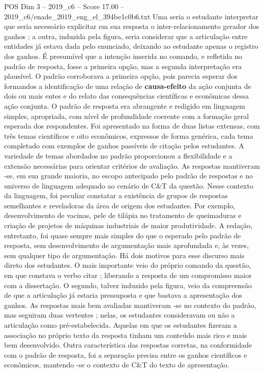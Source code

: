 \begin{textsample}{POS Dim 3 – 2019\_c6 – Score 17.00 – 2019\_c6/enade\_2019\_eng\_el\_394be1c0b6.txt}
Uma seria o estudante interpretar que seria necessário explicitar em sua resposta o inter-relacionamento gerador dos ganhos ; a outra, induzida pela figura, seria considerar que a articulação entre entidades já estava dada pelo enunciado, deixando ao estudante apenas o registro dos ganhos.
É presumível que a intenção inserida no comando, e refletida no padrão de resposta, fosse a primeira opção, mas a segunda interpretação era plausível.
O padrão corroborava a primeira opção, pois parecia esperar dos formandos a identificação de uma relação de \textbf{causa-efeito} da ação conjunta de dois ou mais entes e do relato das consequências científicas e econômicas dessa ação conjunta.
O padrão de resposta era abrangente e redigido em linguagem simples, apropriada, com nível de profundidade coerente com a formação geral esperada dos respondentes.
Foi apresentado na forma de duas listas extensas, com três temas científicos e oito econômicos, expressos de forma genérica, cada tema completado com exemplos de ganhos passíveis de citação pelos estudantes.
A variedade de temas abordados no padrão proporcionou a flexibilidade e a extensão necessárias para orientar critérios de avaliação.
As respostas mantiveram -se, em sua grande maioria, no escopo antecipado pelo padrão de respostas e no universo de linguagem adequado ao cenário de C\&T da questão.
Nesse contexto da linguagem, foi peculiar constatar a existência de grupos de respostas semelhantes e reveladoras da área de origem dos estudantes.
Por exemplo, desenvolvimento de vacinas, pele de tilápia no tratamento de queimaduras e criação de projetos de máquinas industriais de maior produtividade.
A redação, entretanto, foi quase sempre mais simples do que o esperado pelo padrão de resposta, sem desenvolvimento de argumentação mais aprofundada e, às vezes, sem qualquer tipo de argumentação.
Há dois motivos para esse discurso mais direto dos estudantes.
O mais importante veio do próprio comando da questão, em que constava o verbo citar ; liberando a resposta de um compromisso maior com a dissertação.
O segundo, talvez induzido pela figura, veio da compreensão de que a articulação já estaria pressuposta e que bastava a apresentação dos ganhos.
As respostas mais bem avaliadas mantiveram -se no contexto do padrão, mas seguiram duas vertentes ; nelas, os estudantes consideravam ou não a articulação como pré-estabelecida.
Aquelas em que os estudantes fizeram a associação no próprio texto da resposta tinham um conteúdo mais rico e mais bem desenvolvido.
Outra característica das respostas corretas, na conformidade com o padrão de resposta, foi a separação precisa entre os ganhos científicos e econômicos, mantendo -se o contexto de C\&T do texto de apresentação.

\end{textsample}
